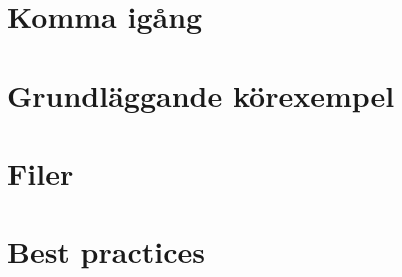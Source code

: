 \pagestyle{plain}

\setcounter{page}{1}
\chapter{Komma igång}\label{sec:intro}


\chapter{Grundläggande körexempel}\label{sec:basicexamples}


\chapter{Filer}\label{sec:files}


\chapter{Best practices}\label{sec:bestpractices}


